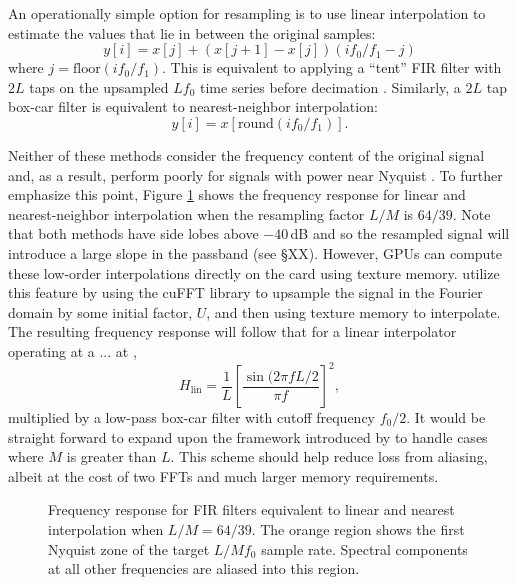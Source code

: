 \documentclass[11pt,preprint]{aastex}
\begin{document}

An operationally simple option for resampling is to use linear interpolation to estimate the values that lie in 
between the original samples:
\begin{equation}
y[i] = x[j] + (x[j+1] - x[j]) (if_0/f_1 - j)
\end{equation}
where $j = \mathrm{floor}(if_0/f_1)$.  This is equivalent to applying a ``tent'' FIR filter with $2L$ taps on the 
upsampled $Lf_0$ time series before decimation \citep{oppenheim10}.  Similarly, a $2L$ tap box-car filter is 
equivalent to nearest-neighbor interpolation:
\begin{equation}
y[i] = x[\mathrm{round}(if_0/f_1)].
\end{equation}

Neither of these methods consider the frequency content of the original signal and, as a result, perform
poorly for signals with power near Nyquist \citep{fraser89}.  To further emphasize this point, Figure 
\ref{fig:windows} shows the frequency response for linear and nearest-neighbor interpolation when 
the resampling factor $L/M$ is $64/39$.  Note that both methods have side lobes above $-40$\,dB and so the 
resampled signal will introduce a large slope in the passband (see \S XX).  However, GPUs can compute 
these low-order interpolations directly on the card using texture memory.  \citet{kim14b} utilize this feature 
by using the cuFFT library to upsample the signal in the Fourier domain by some initial factor, $U$, and then using texture memory to 
interpolate.  The resulting frequency response will follow that for a linear interpolator operating at a ...
at \citep{oppenheim10},
\begin{equation}
H_{\mathrm{lin}} = \frac{1}{L} \left[ \frac{\sin(2 \pi f L/2}{\pi f} \right]^2,
\end{equation}
multiplied by a low-pass box-car filter with cutoff frequency $f_0/2$.  It would be straight forward to 
expand upon the framework introduced by \citet{kim14b} to handle cases where $M$ is greater than $L$.  
This scheme should help reduce loss from aliasing, albeit 
at the cost of two FFTs and much larger memory requirements.

\begin{figure}[H!]
\caption{Frequency response for FIR filters equivalent to linear and nearest interpolation when $L/M = 64/39$.
The orange region shows the first Nyquist zone of the target $L/Mf_0$ sample rate.  Spectral components at all 
other frequencies are aliased into this region.}
\label{fig:windows}
\end{figure}
 
\end{document}
